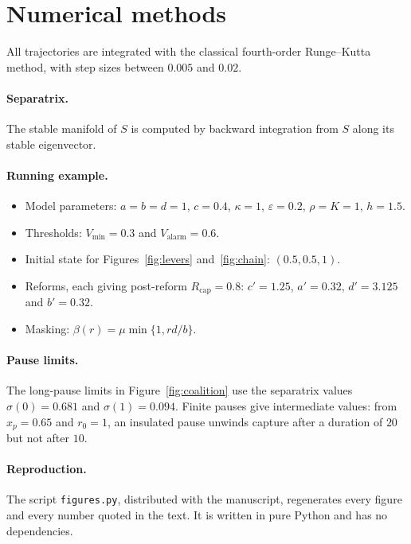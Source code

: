 \documentclass[11pt]{article}
\theoremstyle{plain}
\theoremstyle{definition}
\newcommand{\Rcap}{R_{\mathrm{cap}}}
\newcommand{\Vmin}{V_{\min}}
\newcommand{\Valarm}{V_{\mathrm{alarm}}}
\begin{document}
\section{Numerical methods}\label{app:numerics}

All trajectories are integrated with the classical fourth-order Runge--Kutta method, with step sizes between $0.005$ and $0.02$.

\paragraph{Separatrix.} The stable manifold of $S$ is computed by backward integration from $S$ along its stable eigenvector.

\paragraph{Running example.}
\begin{itemize}[leftmargin=*]
\item Model parameters: $a=b=d=1$, $c=0.4$, $\kappa=1$, $\varepsilon=0.2$, $\rho=K=1$, $h=1.5$.
\item Thresholds: $\Vmin=0.3$ and $\Valarm=0.6$.
\item Initial state for Figures~\ref{fig:levers} and~\ref{fig:chain}: $(0.5,0.5,1)$.
\item Reforms, each giving post-reform $\Rcap=0.8$: $c'=1.25$, $a'=0.32$, $d'=3.125$ and $b'=0.32$.
\item Masking: $\beta(r)=\mu\min\{1,rd/b\}$.
\end{itemize}

\paragraph{Pause limits.} The long-pause limits in Figure~\ref{fig:coalition} use the separatrix values $\sigma(0)=0.681$ and $\sigma(1)=0.094$. Finite pauses give intermediate values: from $x_p=0.65$ and $r_0=1$, an insulated pause unwinds capture after a duration of $20$ but not after $10$.

\paragraph{Reproduction.} The script \texttt{figures.py}, distributed with the manuscript, regenerates every figure and every number quoted in the text. It is written in pure Python and has no dependencies.
\end{document}
